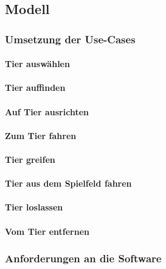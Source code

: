 \subsection{Modell}

\subsubsection{Umsetzung der Use-Cases}

\paragraph{Tier auswählen}

\paragraph{Tier auffinden}

\paragraph{Auf Tier ausrichten}

\paragraph{Zum Tier fahren}

\paragraph{Tier greifen}

\paragraph{Tier aus dem Spielfeld fahren}

\paragraph{Tier loslassen}

\paragraph{Vom Tier entfernen}

\subsubsection{Anforderungen an die Software}

